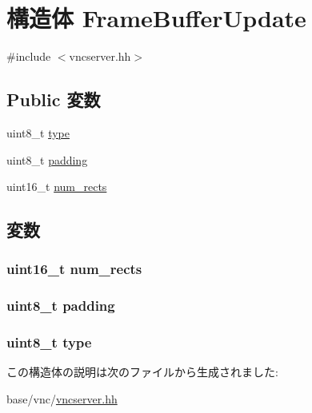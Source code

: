 \hypertarget{structVncServer_1_1FrameBufferUpdate}{
\section{構造体 FrameBufferUpdate}
\label{structVncServer_1_1FrameBufferUpdate}
}


{\ttfamily \#include $<$vncserver.hh$>$}\subsection*{Public 変数}
\begin{DoxyCompactItemize}
\item 
uint8\_\-t \hyperlink{structVncServer_1_1FrameBufferUpdate_a1d127017fb298b889f4ba24752d08b8e}{type}
\item 
uint8\_\-t \hyperlink{structVncServer_1_1FrameBufferUpdate_a78a52d3de83ec4d91a7746456627089f}{padding}
\item 
uint16\_\-t \hyperlink{structVncServer_1_1FrameBufferUpdate_adb65711ffe505542782e4b2eefab5466}{num\_\-rects}
\end{DoxyCompactItemize}


\subsection{変数}
\hypertarget{structVncServer_1_1FrameBufferUpdate_adb65711ffe505542782e4b2eefab5466}{
\subsubsection[{num\_\-rects}]{\setlength{\rightskip}{0pt plus 5cm}uint16\_\-t {\bf num\_\-rects}}}
\label{structVncServer_1_1FrameBufferUpdate_adb65711ffe505542782e4b2eefab5466}
\hypertarget{structVncServer_1_1FrameBufferUpdate_a78a52d3de83ec4d91a7746456627089f}{
\subsubsection[{padding}]{\setlength{\rightskip}{0pt plus 5cm}uint8\_\-t {\bf padding}}}
\label{structVncServer_1_1FrameBufferUpdate_a78a52d3de83ec4d91a7746456627089f}
\hypertarget{structVncServer_1_1FrameBufferUpdate_a1d127017fb298b889f4ba24752d08b8e}{
\subsubsection[{type}]{\setlength{\rightskip}{0pt plus 5cm}uint8\_\-t {\bf type}}}
\label{structVncServer_1_1FrameBufferUpdate_a1d127017fb298b889f4ba24752d08b8e}


この構造体の説明は次のファイルから生成されました:\begin{DoxyCompactItemize}
\item 
base/vnc/\hyperlink{vncserver_8hh}{vncserver.hh}\end{DoxyCompactItemize}
